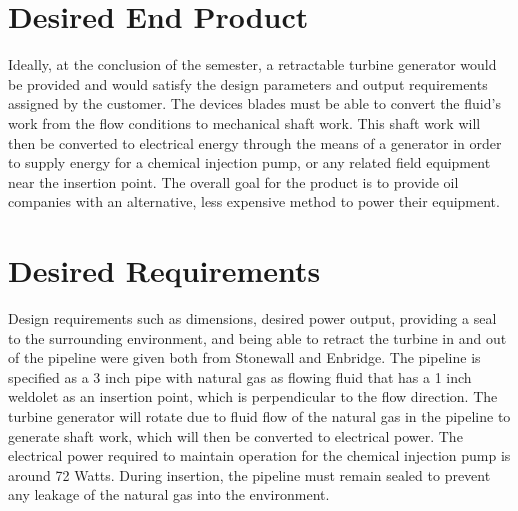 \documentclass[12pt]{article}
\begin{document}
\vspace{-0.2in}
\section{Desired End Product}
\label{sec:End Product}
\vspace{-0.2in}
\doublespacing

\hspace{0.5 in}Ideally, at the conclusion of the semester, a retractable turbine generator would be provided and would satisfy the design parameters and output requirements assigned by the customer. The devices blades must be able to convert the fluid's work from the flow conditions to mechanical shaft work. This shaft work will then be converted to electrical energy through the means of a generator in order to supply energy for a chemical injection pump, or any related field equipment near the insertion point. The overall goal for the product is to provide oil companies with an alternative, less expensive method to power their equipment. 
%
%
\vspace{-0.2in}
\section{Desired Requirements}
\label{sec:Requirements}
\vspace{-0.2in}
\doublespacing

\hspace{0.5 in}Design requirements such as dimensions, desired power output, providing a seal to the surrounding environment, and being able to retract the turbine in and out of the pipeline were given both from Stonewall and Enbridge. The pipeline is specified as a 3 inch pipe with natural gas as flowing fluid that has a 1 inch weldolet as an insertion point, which is perpendicular to the flow direction. The turbine generator will rotate due to fluid flow of the natural gas in the pipeline to generate shaft work, which will then be converted to electrical power. The electrical power required to maintain operation for the chemical injection pump is around 72 Watts. During insertion, the pipeline must remain sealed to prevent any leakage of the natural gas into the environment. 
\vspace{-0.2in}
%
%
\end{document}
